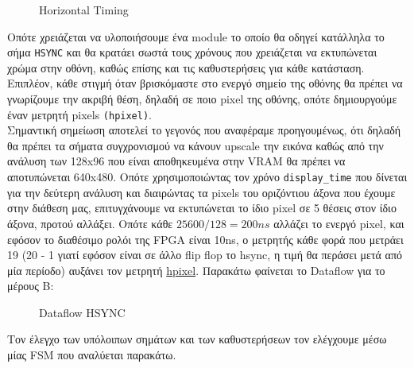 \documentclass[12pt,a4paper]{article}
\begin{document}
	\begin{figure} [htbp]
		\caption{Horizontal Timing}
		\label{Horizontal Timing}
	\end{figure}
	Οπότε χρειάζεται να υλοποιήσουμε ένα module το οποίο θα οδηγεί κατάλληλα το σήμα \verb*|HSYNC| και θα κρατάει σωστά τους χρόνους που χρειάζεται να εκτυπώνεται χρώμα στην οθόνη, καθώς επίσης και τις καθυστερήσεις για κάθε κατάσταση. Επιπλέον, κάθε στιγμή όταν βρισκόμαστε στο ενεργό σημείο της οθόνης θα πρέπει να γνωρίζουμε την ακριβή θέση, δηλαδή σε ποιο pixel της οθόνης, οπότε δημιουργούμε έναν μετρητή pixels \verb*|(hpixel)|.\\ Σημαντική σημείωση αποτελεί το γεγονός που αναφέραμε προηγουμένως, ότι δηλαδή θα πρέπει τα σήματα συγχρονισμού να κάνουν upscale την εικόνα καθώς από την ανάλυση των 128x96 που είναι αποθηκευμένα στην VRAM θα πρέπει να αποτυπώνεται 640x480. Οπότε χρησιμοποιώντας τον χρόνο \verb*|display_time| που δίνεται για την δεύτερη ανάλυση και διαιρώντας τα pixels του οριζόντιου άξονα που έχουμε στην διάθεση μας, επιτυγχάνουμε να εκτυπώνεται το ίδιο pixel σε 5 θέσεις στον ίδιο άξονα, προτού αλλάξει. Οπότε κάθε $25600/128 = 200 ns$ αλλάζει το ενεργό pixel, και εφόσον το διαθέσιμο ρολόι της FPGA είναι 10ns, ο μετρητής κάθε φορά που μετράει 19 (20 - 1 γιατί εφόσον είναι σε άλλο flip flop το hsync, η τιμή θα περάσει μετά από μία περίοδο) αυξάνει τον μετρητή \underline{hpixel}.
	Παρακάτω φαίνεται το Dataflow για το μέρους Β:
	\begin{figure} [H]
			\caption{Dataflow HSYNC}
			\label{Dataflow HSYNC}
	\end{figure}
	Τον έλεγχο των υπόλοιπων σημάτων και των καθυστερήσεων τον ελέγχουμε μέσω μίας FSM που αναλύεται παρακάτω.
\end{document}
